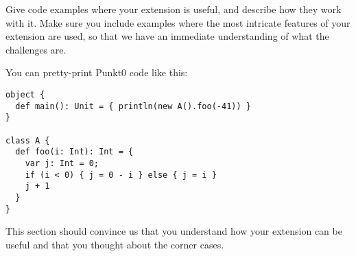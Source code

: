 Give code examples where your extension is useful, and describe how they work
with it. Make sure you include examples where the most intricate features of
your extension are used, so that we have an immediate understanding of what the
challenges are.

You can pretty-print Punkt0 code like this:
\begin{lstlisting}
object {
  def main(): Unit = { println(new A().foo(-41)) }
}

class A {
  def foo(i: Int): Int = {
    var j: Int = 0;
    if (i < 0) { j = 0 - i } else { j = i }
    j + 1
  }
}
\end{lstlisting}

This section should convince us that you understand how your extension can be
useful and that you thought about the corner cases.
